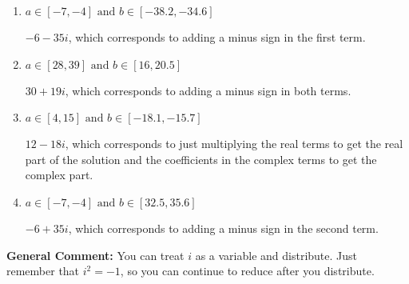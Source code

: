 \documentclass{extbook}[14pt]
\begin{document}
\begin{enumerate}
{\begin{enumerate}[label=\Alph*.]
* $30 - 19 i$, which is the correct option.
\item \( a \in [-7, -4] \text{ and } b \in [-38.2, -34.6] \)

 $-6 - 35 i$, which corresponds to adding a minus sign in the first term.
\item \( a \in [28, 39] \text{ and } b \in [16, 20.5] \)

 $30 + 19 i$, which corresponds to adding a minus sign in both terms.
\item \( a \in [4, 15] \text{ and } b \in [-18.1, -15.7] \)

 $12 - 18 i$, which corresponds to just multiplying the real terms to get the real part of the solution and the coefficients in the complex terms to get the complex part.
\item \( a \in [-7, -4] \text{ and } b \in [32.5, 35.6] \)

 $-6 + 35 i$, which corresponds to adding a minus sign in the second term.
\end{enumerate}

\textbf{General Comment:} You can treat $i$ as a variable and distribute. Just remember that $i^2=-1$, so you can continue to reduce after you distribute.
}
\end{enumerate}
\end{document}
